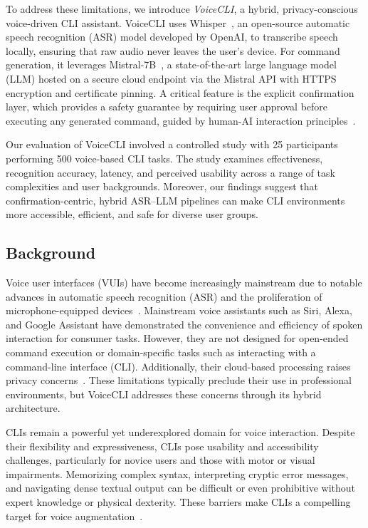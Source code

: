\documentclass[a4paper,12pt]{article}
\begin{document}
To address these limitations, we introduce \textit{VoiceCLI}, a hybrid, privacy-conscious voice-driven CLI assistant. VoiceCLI uses Whisper~\cite{ref10}, an open-source automatic speech recognition (ASR) model developed by OpenAI, to transcribe speech locally, ensuring that raw audio never leaves the user's device. For command generation, it leverages Mistral-7B~\cite{ref11}, a state-of-the-art large language model (LLM) hosted on a secure cloud endpoint via the Mistral API with HTTPS encryption and certificate pinning. A critical feature is the explicit confirmation layer, which provides a safety guarantee by requiring user approval before executing any generated command, guided by human-AI interaction principles~\cite{ref12}.

Our evaluation of VoiceCLI involved a controlled study with 25 participants performing 500 voice-based CLI tasks. The study examines effectiveness, recognition accuracy, latency, and perceived usability across a range of task complexities and user backgrounds. Moreover, our findings suggest that confirmation-centric, hybrid ASR–LLM pipelines can make CLI environments more accessible, efficient, and safe for diverse user groups.


\subsection{Background}

Voice user interfaces (VUIs) have become increasingly mainstream due to notable advances in automatic speech recognition (ASR) and the proliferation of microphone-equipped devices~\cite{ref7}. Mainstream voice assistants such as Siri, Alexa, and Google Assistant have demonstrated the convenience and efficiency of spoken interaction for consumer tasks. However, they are not designed for open-ended command execution or domain-specific tasks such as interacting with a command-line interface (CLI). Additionally, their cloud-based processing raises privacy concerns~\cite{ref8,ref9}. These limitations typically preclude their use in professional environments, but VoiceCLI addresses these concerns through its hybrid architecture.



CLIs remain a powerful yet underexplored domain for voice interaction. Despite their flexibility and expressiveness, CLIs pose usability and accessibility challenges, particularly for novice users and those with motor or visual impairments. Memorizing complex syntax, interpreting cryptic error messages, and navigating dense textual output can be difficult or even prohibitive without expert knowledge or physical dexterity. These barriers make CLIs a compelling target for voice augmentation~\cite{ref2,ref4}.
\end{document}
